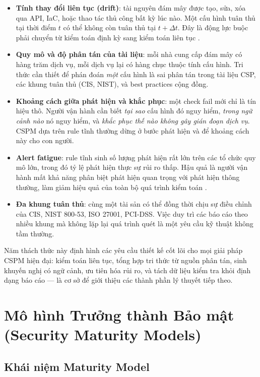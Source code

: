 \begin{itemize}
  \item \textbf{Tính thay đổi liên tục (drift)}: tài nguyên đám mây được tạo, sửa, xóa qua API, IaC, hoặc thao tác thủ công bất kỳ lúc nào. Một cấu hình tuân thủ tại thời điểm $t$ có thể không còn tuân thủ tại $t+\Delta t$. Đây là động lực buộc phải chuyển từ kiểm toán định kỳ sang kiểm toán liên tục \cite{continuous_compliance_2022}.
  \item \textbf{Quy mô và độ phân tán của tài liệu}: mỗi nhà cung cấp đám mây có hàng trăm dịch vụ, mỗi dịch vụ lại có hàng chục thuộc tính cấu hình. Tri thức cần thiết để phán đoán \textit{một} cấu hình là sai phân tán trong tài liệu CSP, các khung tuân thủ (CIS, NIST), và best practices cộng đồng.
  \item \textbf{Khoảng cách giữa phát hiện và khắc phục}: một check fail mới chỉ là tín hiệu thô. Người vận hành cần biết \textit{tại sao} cấu hình đó nguy hiểm, \textit{trong ngữ cảnh nào} nó nguy hiểm, và \textit{khắc phục thế nào không gây gián đoạn dịch vụ}. CSPM dựa trên rule tĩnh thường dừng ở bước phát hiện và để khoảng cách này cho con người.
  \item \textbf{Alert fatigue}: rule tĩnh sinh số lượng phát hiện rất lớn trên các tổ chức quy mô lớn, trong đó tỷ lệ phát hiện thực sự rủi ro thấp. Hậu quả là người vận hành mất khả năng phân biệt phát hiện quan trọng với phát hiện thông thường, làm giảm hiệu quả của toàn bộ quá trình kiểm toán \cite{nist_sp_800_204}.
  \item \textbf{Đa khung tuân thủ}: cùng một tài sản có thể đồng thời chịu sự điều chỉnh của CIS, NIST 800-53, ISO 27001, PCI-DSS. Việc duy trì các báo cáo theo nhiều khung mà không lặp lại quá trình quét là một yêu cầu kỹ thuật không tầm thường.
\end{itemize}

Năm thách thức này định hình các yêu cầu thiết kế cốt lõi cho mọi giải pháp CSPM hiện đại: kiểm toán liên tục, tổng hợp tri thức từ nguồn phân tán, sinh khuyến nghị có ngữ cảnh, ưu tiên hóa rủi ro, và tách dữ liệu kiểm tra khỏi định dạng báo cáo --- là cơ sở để giới thiệu các thành phần lý thuyết tiếp theo.

\section{Mô hình Trưởng thành Bảo mật (Security Maturity Models)}
\label{sec:maturity}

\subsection{Khái niệm Maturity Model}
\label{subsec:maturity-concept}

